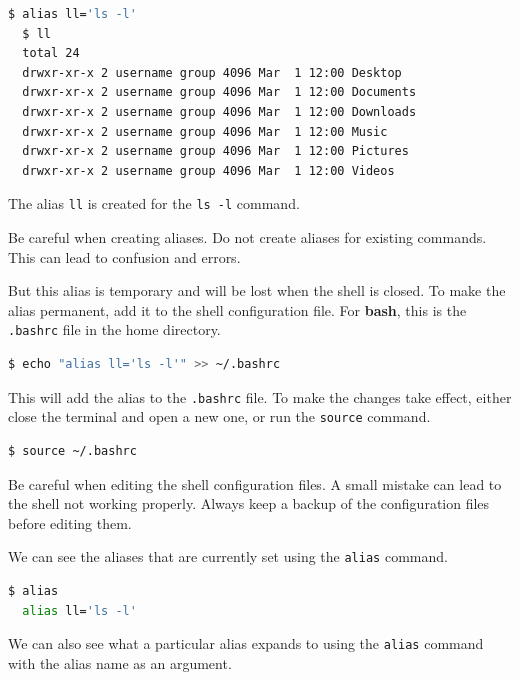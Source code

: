 \begin{lstlisting}[language=bash]
  $ alias ll='ls -l'
  $ ll
  total 24
  drwxr-xr-x 2 username group 4096 Mar  1 12:00 Desktop
  drwxr-xr-x 2 username group 4096 Mar  1 12:00 Documents
  drwxr-xr-x 2 username group 4096 Mar  1 12:00 Downloads
  drwxr-xr-x 2 username group 4096 Mar  1 12:00 Music
  drwxr-xr-x 2 username group 4096 Mar  1 12:00 Pictures
  drwxr-xr-x 2 username group 4096 Mar  1 12:00 Videos
\end{lstlisting}

The alias \texttt{ll} is created for the \texttt{ls -l} command.

\begin{warn}
  Be careful when creating aliases.
  Do not create aliases for existing commands.
  This can lead to confusion and errors.
\end{warn}

But this alias is temporary and will be lost when the shell is closed.
To make the alias permanent, add it to the shell configuration file.
For \textbf{bash}, this is the \texttt{.bashrc} file in the home directory.

\begin{lstlisting}[language=bash]
  $ echo "alias ll='ls -l'" >> ~/.bashrc
\end{lstlisting}

This will add the alias to the \texttt{.bashrc} file.
To make the changes take effect, either close the terminal and open a new one, or run the \texttt{source} command.

\begin{lstlisting}[language=bash]
  $ source ~/.bashrc
\end{lstlisting}


\begin{warn}
  Be careful when editing the shell configuration files.
  A small mistake can lead to the shell not working properly.
  Always keep a backup of the configuration files before editing them.
\end{warn}

We can see the aliases that are currently set using the \texttt{alias} command.

\begin{lstlisting}[language=bash]
  $ alias
  alias ll='ls -l'
\end{lstlisting}

We can also see what a particular alias expands to using the \texttt{alias} command with the alias name as an argument.

